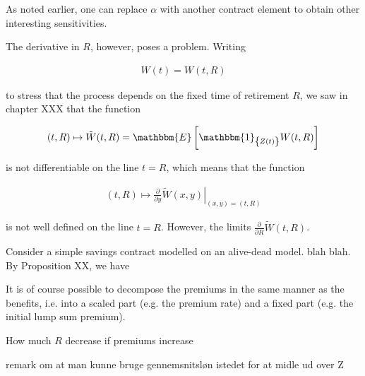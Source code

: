 \documentclass{article}
\newcommand{\1}[1]{\mathbbm{1}_{\left\lbrace #1 \right\rbrace}}
\newcommand{\expec}[1][def]{\mathbbm{E} \left[ #1 \right]}
\theoremstyle{break}
\theoremstyle{remark}
\newenvironment{remark}
  {\pushQED{\qed}\renewcommand{\qedsymbol}{\scalebox{1.4}{$\circ$}}\remarkx}
  {\popQED\endremarkx}
\numberwithin{equation}{section}
\begin{document}
As noted earlier, one can replace $\alpha$ with another contract element to obtain other interesting sensitivities.

The derivative in $R$, however, poses a problem. Writing

\begin{align*}
	W(t) = W(t,R)
\end{align*}

to stress that the process depends on the fixed time of retirement $R$, we saw in chapter XXX that the function

\begin{align*}
	(t,R) \mapsto \tilde{W}(t,R) = \expec[\1{Z(t)}W(t,R)]
\end{align*}

is not differentiable on the line $t=R$, which means that the function

\begin{align*}
	(t,R) \mapsto \left. \frac{\partial}{\partial y} \tilde{W}(x,y) \right|_{(x,y)=(t,R)}
\end{align*}

is not well defined on the line $t=R$. However, the limits $\frac{\partial}{\partial R} \tilde{W}(t,R)$.

\begin{example}
	Consider a simple savings contract modelled on an alive-dead model. blah blah. By Proposition XX, we have
\end{example}

\begin{remark}
It is of course possible to decompose the premiums in the same manner as the benefits, i.e. into a scaled part (e.g. the premium rate) and a fixed part (e.g. the initial lump sum premium).
\end{remark}

\begin{remark}
How much $R$ decrease if premiums increase
\end{remark}

\begin{remark}
	remark om at man kunne bruge gennemsnitsløn istedet for at midle ud over Z
\end{remark}
\end{document}
